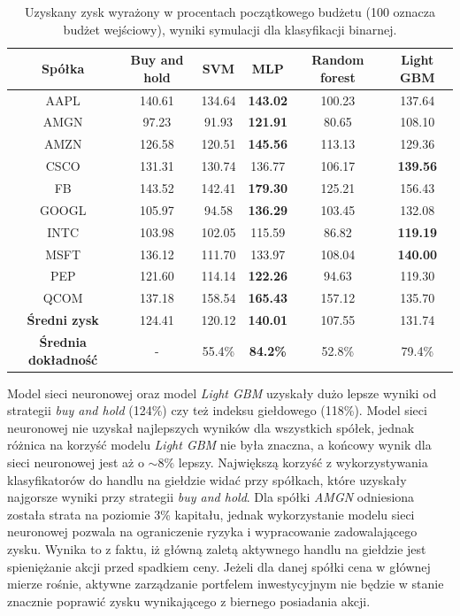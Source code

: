 \documentclass[a4paper, twoside, 11pt, openright]{article}
\begin{document}
 \begin{table}[H]
    \centering
    \begin{tabular}{|c|c|c|c|c|c|}
    \hline
        \textbf{Spółka}  & \textbf{Buy and hold} & \textbf{SVM} &  \textbf{MLP}  &  \textbf{Random forest}  &  \textbf{Light GBM} \\ \hline
AAPL & 140.61 & 134.64  &  \textbf{143.02} & 100.23 & 137.64\\ \hline
AMGN & 97.23 &  91.93 & \textbf{121.91}  & 80.65 &  108.10 \\ \hline
AMZN & 126.58 &  120.51 & \textbf{145.56} & 113.13 & 129.36 \\ \hline
CSCO & 131.31 & 130.74  & 136.77  & 106.17 &  \textbf{139.56} \\ \hline
FB   & 143.52 & 142.41  & \textbf{179.30} & 125.21 & 156.43 \\ \hline
GOOGL & 105.97 &  94.58 &  \textbf{136.29} & 103.45 & 132.08 \\ \hline
INTC & 103.98 & 102.05  & 115.59  & 86.82 & \textbf{119.19} \\ \hline
MSFT &  136.12 & 111.70  &  133.97  & 108.04 & \textbf{140.00} \\ \hline
PEP  & 121.60 &  114.14 &  \textbf{122.26} & 94.63 & 119.30 \\ \hline
QCOM & 137.18 &  158.54 &  \textbf{165.43} & 157.12 & 135.70  \\ \hline \hline
\textbf{Średni zysk} & 124.41 & 120.12 & \textbf{140.01} &  107.55 & 131.74 \\  \hline 
\textbf{Średnia dokładność} &  - & 55.4\% & \textbf{84.2\%} &  52.8\% & 79.4\% \\  \hline   
    \end{tabular}
    \caption{Uzyskany zysk wyrażony w procentach początkowego budżetu (100 oznacza budżet wejściowy), wyniki symulacji dla klasyfikacji binarnej.}
    \label{tab:comparison_simulation_binary}
\end{table}   

Model sieci neuronowej oraz model \textit{Light GBM} uzyskały dużo lepsze wyniki od strategii \textit{buy and hold} (124\%) czy też indeksu giełdowego (118\%). Model sieci neuronowej nie uzyskał najlepszych wyników dla wszystkich spółek, jednak różnica na korzyść modelu \textit{Light GBM} nie była znaczna, a końcowy wynik dla sieci neuronowej jest aż o $\sim 8\%$ lepszy. Największą korzyść z wykorzystywania klasyfikatorów do handlu na giełdzie widać przy spółkach, które uzyskały najgorsze wyniki przy strategii \textit{buy and hold}. Dla spółki \textit{AMGN} odniesiona została strata na poziomie 3\% kapitału, jednak wykorzystanie modelu sieci neuronowej pozwala na ograniczenie ryzyka i wypracowanie zadowalającego zysku. Wynika to z faktu, iż główną zaletą aktywnego handlu na giełdzie jest spieniężanie akcji przed spadkiem ceny. Jeżeli dla danej spółki cena w głównej mierze rośnie, aktywne zarządzanie portfelem inwestycyjnym nie będzie w stanie znacznie poprawić zysku wynikającego z biernego posiadania akcji.
\end{document}
